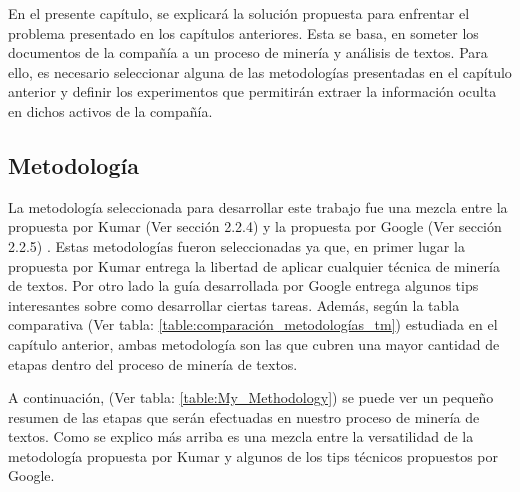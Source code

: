 
En el presente capítulo, se explicará la solución propuesta para enfrentar el problema presentado en los capítulos anteriores. Esta se basa, en someter los documentos de la compañía a un proceso de minería y análisis de textos. Para ello, es necesario seleccionar alguna de las metodologías presentadas en el capítulo anterior y definir los experimentos que permitirán extraer la información oculta en dichos activos de la compañía.

\subsection{Metodología}
    La metodología seleccionada para desarrollar este trabajo fue una mezcla entre la propuesta por Kumar (Ver sección 2.2.4) y la propuesta por Google (Ver sección 2.2.5) . Estas metodologías fueron seleccionadas ya que, en primer lugar la propuesta por Kumar entrega la libertad de aplicar cualquier técnica de minería de textos. Por otro lado la guía desarrollada por Google entrega algunos tips interesantes sobre como desarrollar ciertas tareas. Además, según la tabla comparativa (Ver tabla: \ref{table:comparación_metodologías_tm}) estudiada en el
    capítulo anterior, ambas metodología son las que cubren una mayor cantidad de etapas dentro del proceso de minería de textos. 
    
    A continuación, (Ver tabla: \ref{table:My_Methodology})  se puede ver un pequeño resumen de las etapas que serán efectuadas en nuestro proceso de minería de textos. Como se explico más arriba es una mezcla entre la versatilidad de la metodología propuesta por Kumar y algunos de los tips técnicos propuestos por Google.
    
